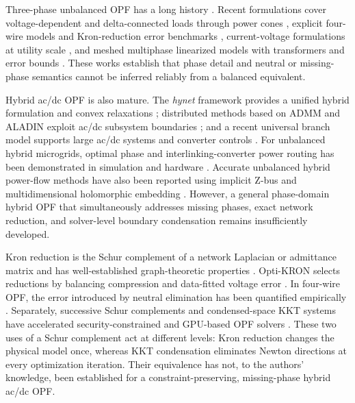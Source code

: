 \documentclass[journal,10pt]{IEEEtran}
\begin{document}
Three-phase unbalanced OPF has a long history
\cite{bruno2011unbalanced,rao2019helm}.  Recent formulations cover
voltage-dependent and delta-connected loads through power cones
\cite{claeys2021powercones}, explicit four-wire models and Kron-reduction error
benchmarks \cite{claeys2022fourwire}, current-voltage formulations at utility
scale \cite{soltani2024ivopf}, and meshed multiphase linearized models with
transformers and error bounds \cite{wang2026linearized}.  These works establish
that phase detail and neutral or missing-phase semantics cannot be inferred
reliably from a balanced equivalent.

Hybrid ac/dc OPF is also mature.  The \emph{hynet} framework provides a unified
hybrid formulation and convex relaxations \cite{hotz2020hynet}; distributed
methods based on ADMM and ALADIN exploit ac/dc subsystem boundaries
\cite{meyer2019distributed,zhai2022aladin}; and a recent universal branch model
supports large ac/dc systems and converter controls \cite{shahbazi2025sadra}.
For unbalanced hybrid microgrids, optimal phase and interlinking-converter power
routing has been demonstrated in simulation and hardware
\cite{esfahani2020routing}.  Accurate unbalanced hybrid power-flow methods have
also been reported using implicit Z-bus and multidimensional holomorphic
embedding \cite{pompodakis2021generic,sun2024mdhem}.  However, a general
phase-domain hybrid OPF that simultaneously addresses missing phases, exact
network reduction, and solver-level boundary condensation remains insufficiently
developed.

Kron reduction is the Schur complement of a network Laplacian or admittance
matrix and has well-established graph-theoretic properties
\cite{dorfler2013kron}.  Opti-KRON selects reductions by balancing compression
and data-fitted voltage error \cite{chevalier2022optikron}.  In four-wire OPF,
the error introduced by neutral elimination has been quantified empirically
\cite{claeys2022fourwire}.  Separately, successive Schur complements and
condensed-space KKT systems have accelerated security-constrained and GPU-based
OPF solvers \cite{kardos2020schur,shin2024gpu}.  These two uses of a Schur
complement act at different levels: Kron reduction changes the physical model
once, whereas KKT condensation eliminates Newton directions at every
optimization iteration.  Their equivalence has not, to the authors' knowledge,
been established for a constraint-preserving, missing-phase hybrid ac/dc OPF.
\end{document}
